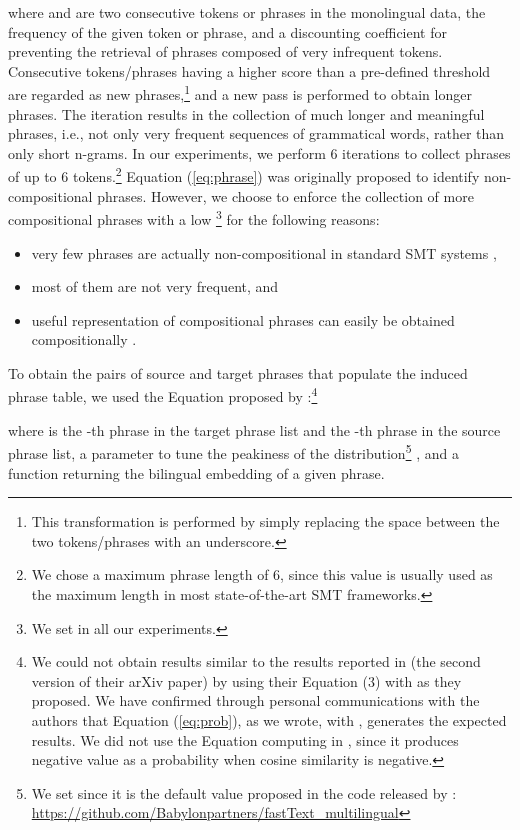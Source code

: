 \documentclass[11pt,a4paper]{article}
\newcommand{\Eq}[1]{{Equation (\ref{eq:#1})}}
\begin{document}
where  and  are two consecutive tokens or phrases in the monolingual data,  the frequency of the given token or phrase, and  a discounting coefficient for preventing the retrieval of phrases composed of very infrequent tokens. Consecutive tokens/phrases having a higher score than a pre-defined threshold are regarded as new phrases,\footnote{This transformation is performed by simply replacing the space between the two tokens/phrases with an underscore.} and a new pass is performed to obtain longer phrases.
The iteration results in the collection of much longer and meaningful phrases, i.e., not only very frequent sequences of grammatical words, rather than only short n-grams. In our experiments, we perform 6 iterations to collect phrases of up to 6 tokens.\footnote{We chose a maximum phrase length of 6, since this value is usually used as the maximum length in most state-of-the-art SMT frameworks.} \Eq{phrase} was originally proposed to identify non-compositional phrases. However, we choose to enforce the collection of more compositional phrases with a low \footnote{We set  in all our experiments.} for the following reasons:
\begin{itemize}\itemsep=0mm
\item very few phrases are actually non-compositional in standard SMT systems \citep{D12-1089},
\item most of them are not very frequent, and
\item useful representation of compositional phrases can easily be obtained compositionally \citep{N15-1176}.
\end{itemize}

To obtain the pairs of source and target phrases that populate the induced phrase table, we used the Equation proposed by \citet{DBLP:journals/corr/abs-1804-07755}:\footnote{We could not obtain results similar to the results reported in \citet{DBLP:journals/corr/abs-1804-07755} (the second version of their arXiv paper) by using their Equation (3) with  as they proposed.  We have confirmed through personal communications with the authors that \Eq{prob}, as we wrote, with , generates the expected results. We did not use the Equation computing  in \citet{artetxe2018unsupervised}, since it produces negative value as a probability when cosine similarity is negative.}

where  is the -th phrase in the target phrase list
and  the -th phrase in the source phrase list,  a parameter to tune the peakiness of the distribution\footnote{We set  since it is the default value proposed in the code released by \citet{DBLP:journals/corr/SmithTHH17}: \url{https://github.com/Babylonpartners/fastText_multilingual}} \citep{DBLP:journals/corr/SmithTHH17}, and  a function returning the bilingual embedding of a given phrase.
\end{document}
